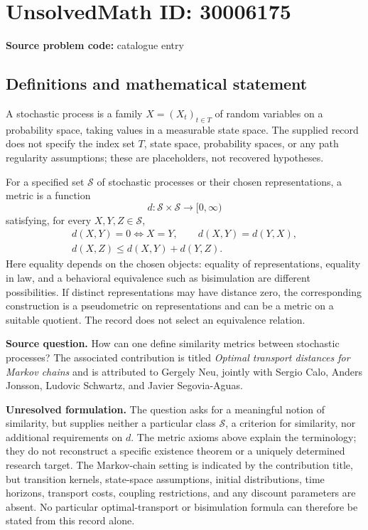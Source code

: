 \documentclass[11pt]{article}
\begin{document}
\section*{UnsolvedMath ID: 30006175}
\textbf{Source problem code:} catalogue entry
\subsection{Definitions and mathematical statement}
A stochastic process is a family \(X=(X_t)_{t\in T}\) of random variables on a probability space, taking values in a measurable state space. The supplied record does not specify the index set \(T\), state space, probability spaces, or any path regularity assumptions; these are placeholders, not recovered hypotheses.

For a specified set \(\mathcal S\) of stochastic processes or their chosen representations, a metric is a function
\[
d:\mathcal S\times\mathcal S\longrightarrow[0,\infty)
\]
satisfying, for every \(X,Y,Z\in\mathcal S\),
\[
\begin{gathered}
d(X,Y)=0\iff X=Y,\qquad d(X,Y)=d(Y,X),\\
d(X,Z)\le d(X,Y)+d(Y,Z).
\end{gathered}
\]
Here equality depends on the chosen objects: equality of representations, equality in law, and a behavioral equivalence such as bisimulation are different possibilities. If distinct representations may have distance zero, the corresponding construction is a pseudometric on representations and can be a metric on a suitable quotient. The record does not select an equivalence relation.

\textbf{Source question.} How can one define similarity metrics between stochastic processes? The associated contribution is titled \emph{Optimal transport distances for Markov chains} and is attributed to Gergely Neu, jointly with Sergio Calo, Anders Jonsson, Ludovic Schwartz, and Javier Segovia-Aguas.

\textbf{Unresolved formulation.} The question asks for a meaningful notion of similarity, but supplies neither a particular class \(\mathcal S\), a criterion for similarity, nor additional requirements on \(d\). The metric axioms above explain the terminology; they do not reconstruct a specific existence theorem or a uniquely determined research target. The Markov-chain setting is indicated by the contribution title, but transition kernels, state-space assumptions, initial distributions, time horizons, transport costs, coupling restrictions, and any discount parameters are absent. No particular optimal-transport or bisimulation formula can therefore be stated from this record alone.
\end{document}
